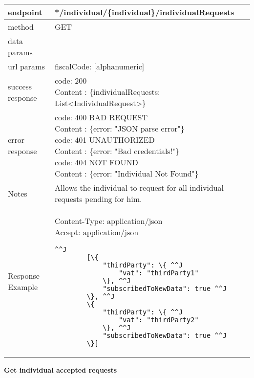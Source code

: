 	\begin{tabularx}{\linewidth}{| l| l }
		\hline
		endpoint & */individual/\{individual\}/individualRequests \\
		\hline
		method & GET \\
		\hline
		data params & \\
		\hline
		url params &
		\parbox{0.7\textwidth}{
			\bigskip
			fiscalCode: [alphanumeric]
			\bigskip
		} \\
		\hline
		success response &
		\parbox{0.7\textwidth}{
			\bigskip
			code: 200\\
			Content : \{individualRequests: List<IndividualRequest>\}
			\bigskip
		} \\
		\hline
		error response &
		\parbox{0.7\textwidth}{
			\bigskip
			code: 400 BAD REQUEST \\
			Content : \{error: "JSON parse error"\}\\
			code: 401 UNAUTHORIZED \\
			Content : \{error: "Bad credentials!"\}\\
			code: 404 NOT FOUND \\
			Content : \{error: "Individual Not Found"\}
			\bigskip
		} \\
		\hline
		Notes & 
		\parbox{0.7\textwidth}{
			\bigskip Allows the individual to request for all individual requests pending for him.
		\bigskip}  \\
		\hline
		Response Example & 
		\parbox{0.8\textwidth}{
		\bigskip
		Content-Type: application/json \\
		Accept: application/json \\
		\bigskip
		\begin{lstlisting}^^J
		[\{
			"thirdParty": \{ ^^J
				"vat": "thirdParty1"
			\}, ^^J
			"subscribedToNewData": true ^^J
		\}, ^^J
		\{
			"thirdParty": \{ ^^J
				"vat": "thirdParty2"
			\}, ^^J
			"subscribedToNewData": true ^^J
		\}]
	\end{lstlisting}
	} \\
	\hline
	\end{tabularx}
	
	\textbf{Get individual accepted requests} \\

